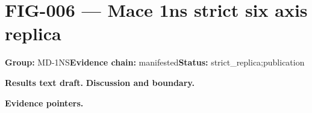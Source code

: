 \clearpage
\section{FIG-006 --- Mace 1ns strict six axis replica}
\label{figpage:fig-006}
\textbf{Group:} MD-1NS\quad \textbf{Evidence chain:} manifested\quad \textbf{Status:} strict\_replica;publication

\textbf{Results text draft.} 
\textbf{Discussion and boundary.} 


\textbf{Evidence pointers.}



\vfill
